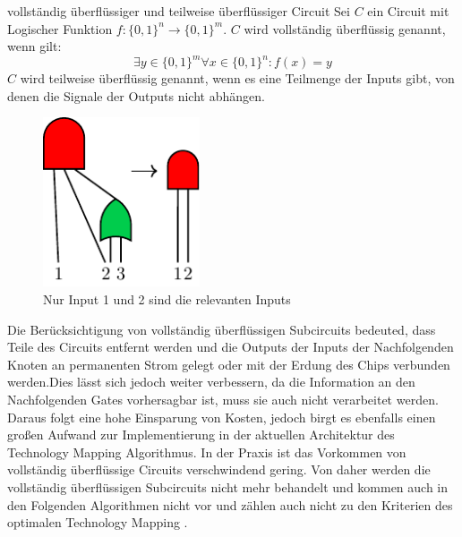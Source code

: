 \documentclass[11pt, a4paper, german]{article}
\newcommand{\TM}{Technology Mapping }
\begin{document}
 \begin{definition}{vollständig überflüssiger und teilweise überflüssiger Circuit }
 	Sei $C$ ein Circuit mit Logischer Funktion $ f : \{ 0 , 1 \}^n \rightarrow \{ 0 , 1 \}^m $. $C$ wird vollständig überflüssig genannt, wenn gilt:
 	\[  \exists y \in \{0,1 \}^m \forall x \in \{ 0, 1\}^n : f(x) = y  \]
 	$C$ wird teilweise überflüssig genannt, wenn es eine Teilmenge der Inputs gibt, von denen die Signale der Outputs nicht abhängen.
 \end{definition}
 \begin{figure}
		\includegraphics[height = 5cm]{pictures/compiled/partly_redundant}
		\caption{Nur Input 1 und 2 sind die relevanten Inputs}
		\label{bild:partly_redundant}
\end{figure}
Die Berücksichtigung von vollständig überflüssigen Subcircuits bedeuted, dass Teile des Circuits entfernt werden und die Outputs der Inputs der Nachfolgenden Knoten an permanenten Strom gelegt oder mit der Erdung des Chips verbunden werden.Dies lässt sich jedoch weiter verbessern, da die Information an den Nachfolgenden Gates vorhersagbar ist, muss sie auch nicht verarbeitet werden. Daraus folgt eine hohe Einsparung von Kosten, jedoch birgt es ebenfalls einen großen Aufwand zur Implementierung in der aktuellen Architektur des \TM Algorithmus. In der Praxis ist das Vorkommen von  vollständig überflüssige Circuits verschwindend gering. Von daher werden die vollständig überflüssigen Subcircuits nicht mehr behandelt und kommen auch in den Folgenden Algorithmen nicht vor und zählen auch nicht zu den Kriterien des optimalen \TM. \\
 
\end{document}
